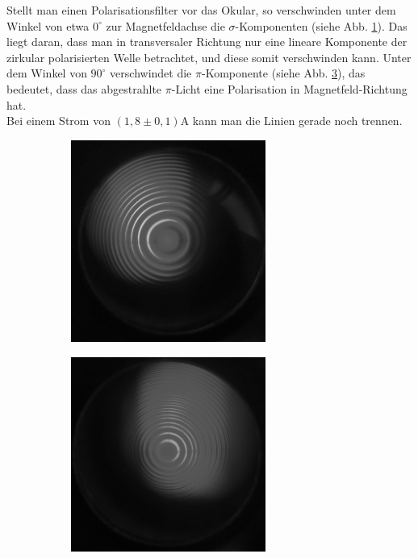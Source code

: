 Stellt man einen Polarisationsfilter vor das Okular, so verschwinden unter dem Winkel von etwa $0^\circ$ zur Magnetfeldachse die $\sigma$-Komponenten (siehe Abb. \ref{fig:bildtransmitBsigma}). Das liegt daran, dass man in transversaler Richtung nur eine lineare Komponente der zirkular polarisierten Welle betrachtet, und diese somit verschwinden kann. Unter dem Winkel von $90^\circ$ verschwindet die $\pi$-Komponente (siehe Abb. \ref{fig:bildtransmitBpi}), das bedeutet, dass das abgestrahlte $\pi$-Licht eine Polarisation in Magnetfeld-Richtung hat.\\
Bei einem Strom von $\si{(1,8\pm 0,1)\ampere}$ kann man die Linien gerade noch trennen.

\begin{figure}[h]
  \centering
  \begin{subfigure}[h]{0.5\textwidth}
    \centering
    \includegraphics[width=0.7\textwidth]{data/bilder_okular/bild_3_edit.jpg}
    \label{fig:bildtransmitBsigma}
  \end{subfigure}%
  \begin{subfigure}[h]{0.5\textwidth}
    \centering
    \includegraphics[width=0.7\textwidth]{data/bilder_okular/bild_4_edit.jpg}
    \label{fig:bildtransmitBpi}
  \end{subfigure}
  \caption{}
\end{figure}

